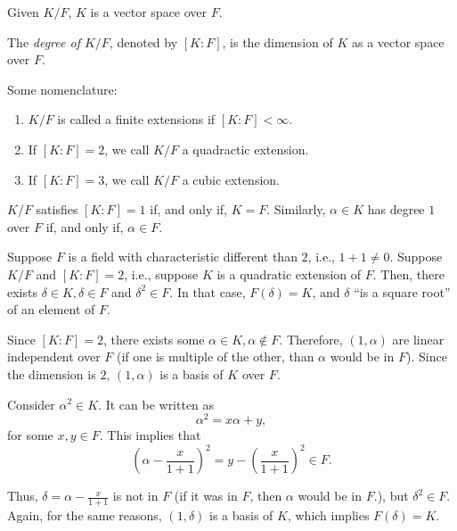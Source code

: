 
\begin{prop}
	Given $K/F$, $K$ is a vector space over $F$.
\end{prop}

\begin{defn}[Degree of $K/F$]
The \emph{degree of $K/F$}, denoted by $[K:F]$, is the dimension of $K$ as a vector space over $F$.
\end{defn}

\begin{defn}
	Some nomenclature:
	\begin{enumerate}[label = --]
		\item $K/F$ is called a finite extensions if $[K:F] < \infty$.
		\item If $[K:F] = 2$, we call $K/F$ a quadractic extension.
		\item If $[K:F] = 3$, we call $K/F$ a cubic extension.
	\end{enumerate}
\end{defn}

\begin{prop}
	$K/F$ satisfies $[K : F] = 1$ if, and only if, $K = F$. Similarly, $\alpha \in K$ has degree $1$ over $F$ if, and only if, $\alpha \in F$.
\end{prop}

\begin{prop}
	Suppose $F$ is a field with characteristic different than $2$, i.e., $1 + 1 \neq 0$. Suppose $K/F$ and $[K:F] = 2$, i.e., suppose  $K$ is a quadratic extension of $F$. Then, there exists $\delta \in K, \delta \in F$ and $\delta^2 \in F$. In that case, $F(\delta) = K$, and $\delta$ ``is a square root'' of an element of $F$.
\end{prop}

\begin{dem}
	Since $[K : F] = 2$, there exists some $\alpha \in K, \alpha \not\in F$. Therefore, $(1, \alpha)$ are linear independent over $F$ (if one is multiple of the other, than $\alpha$ would be in $F$). Since the dimension is $2$, $(1, \alpha)$ is a basis of $K$ over $F$.

	Consider $\alpha^2 \in K$. It can be written as \[\alpha^2 = x\alpha + y,\] for some $x, y \in F$. This implies that \[\left(\alpha - \frac{x}{1+1}\right)^2 = y - \left(\frac{x}{1+1}\right)^2 \in F.\]

	Thus, $\delta = \alpha - \frac{x}{1+1}$ is not in $F$ (if it was in $F$, then $\alpha$ would be in $F$.), but $\delta^2 \in F$. Again, for the same reasons, $(1, \delta)$ is a basis of $K$, which implies $F(\delta) = K$.
\end{dem}

